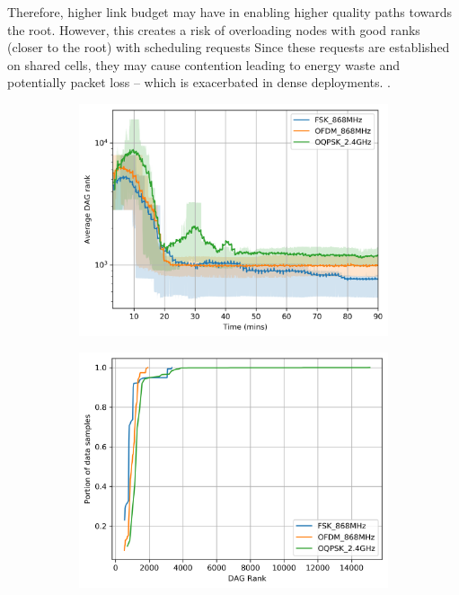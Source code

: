 \documentclass[journal]{IEEEtran}
\begin{document}
Therefore, higher link budget may have in enabling higher quality paths towards the root. 
However, this creates a risk of overloading nodes with good ranks (closer to the root) with scheduling requests 
Since these requests are established on shared cells, they may cause contention leading to energy waste and potentially packet loss -- which is exacerbated in dense deployments. .

\begin{figure}[ht!]
	\centering
	\begin{subfigure}{0.6\columnwidth}
	\centering
	\includegraphics[width=1\columnwidth]{avg_dagRank_plot}
    \label{fig:dagrank_time}
	\end{subfigure}
	\begin{subfigure}{0.6\columnwidth}
		\centering
    	\includegraphics[width=01\columnwidth]{dagRank_cdf_plot_full_steady}

\end{subfigure}
\end{figure}
\end{document}

